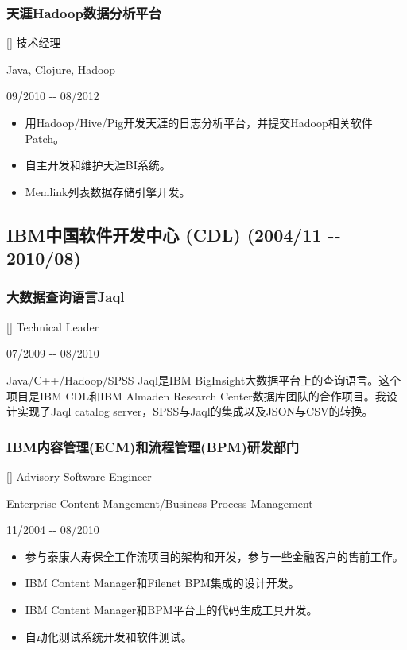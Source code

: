 \documentclass[a4paper]{article}
\newenvironment{DUlineblock}[1]{%
    \list{}{\setlength{\partopsep}{\parskip}
            \addtolength{\partopsep}{\baselineskip}
            \setlength{\topsep}{0pt}
            \setlength{\itemsep}{0.15\baselineskip}
            \setlength{\parsep}{0pt}
            \setlength{\leftmargin}{#1}}
    \raggedright
  }
  {\endlist}
\begin{document}
\begin{CJK}{UTF8}{gkai}
\subsubsection*{天涯Hadoop数据分析平台}
\begin{DUlineblock}{0em}
\item[] 技术经理
\item[] Java, Clojure, Hadoop
\item[] 09/2010 -{}- 08/2012
\end{DUlineblock}
%
\begin{itemize}
\item 用Hadoop/Hive/Pig开发天涯的日志分析平台，并提交Hadoop相关软件Patch。
\item 自主开发和维护天涯BI系统。
\item Memlink列表数据存储引擎开发。
\end{itemize}

\subsection*{IBM中国软件开发中心 (CDL) (2004/11 -{}- 2010/08)}

\subsubsection*{大数据查询语言Jaql}
\begin{DUlineblock}{0em}
\item[] Technical Leader
\item[] 07/2009 -{}- 08/2010
\item[] Java/C++/Hadoop/SPSS
\end{DUlineblock}
Jaql是IBM BigInsight大数据平台上的查询语言。这个
项目是IBM CDL和IBM Almaden Research Center数据库团队的合作项目。我设计实现了Jaql catalog server，SPSS与Jaql的集成以及JSON与CSV的转换。

\subsubsection*{IBM内容管理(ECM)和流程管理(BPM)研发部门}
\begin{DUlineblock}{0em}
\item[] Advisory Software Engineer
\item[] Enterprise Content Mangement/Business Process Management
\item[] 11/2004 -{}- 08/2010
\end{DUlineblock}
\begin{itemize}
\item 参与泰康人寿保全工作流项目的架构和开发，参与一些金融客户的售前工作。
\item IBM Content Manager和Filenet BPM集成的设计开发。
\item IBM Content Manager和BPM平台上的代码生成工具开发。
\item 自动化测试系统开发和软件测试。
\end{itemize}


\end{CJK}
\end{document}
